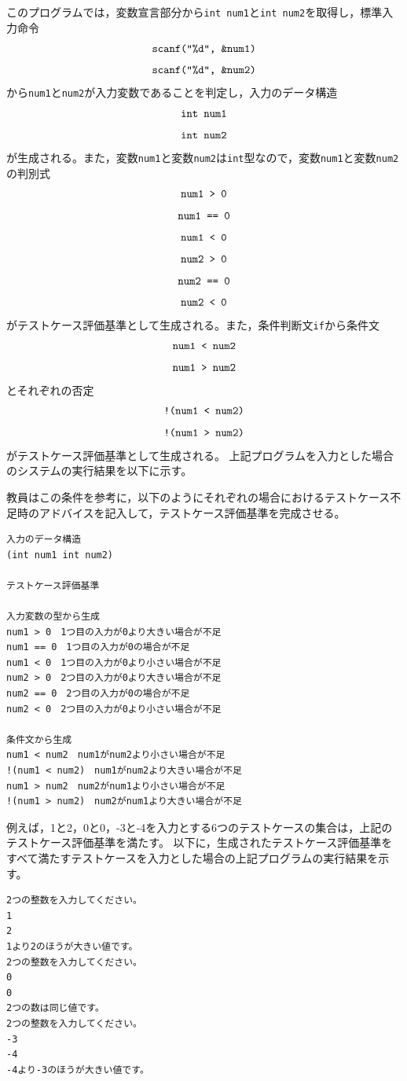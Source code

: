 \documentclass{tpu-sotu}
\begin{document}

このプログラムでは，変数宣言部分から{\tt int num1}と{\tt int num2}を取得し，標準入力命令\\
\[ 
\mbox{{\tt {scanf("\%d", \&num1)}}}
\]
\[ 
\mbox{{\tt {scanf("\%d", \&num2)}}}
\]
から{\tt num1}と{\tt num2}が入力変数であることを判定し，入力のデータ構造\\
\[
\mbox{{\tt int num1}}
\]
\[
\mbox{{\tt int num2}}
\]
が生成される。また，変数{\tt num1}と変数{\tt num2}は{\tt int}型なので，変数{\tt num1}と変数{\tt num2}の判別式\\
\[ 
\mbox{\tt{num1 > 0}} 
\]
\[
\mbox{\tt{num1 == 0}}
\]
\[
\mbox{\tt{num1 < 0}}
\]
\[ 
\mbox{\tt{num2 > 0}} 
\]
\[
\mbox{\tt{num2 == 0}}
\]
\[
\mbox{\tt{num2 < 0}}
\]
がテストケース評価基準として生成される。また，条件判断文{\tt if}から条件文\\
\[
\mbox{\tt{num1 < num2}}
\]
\[
\mbox{\tt{num1 > num2}}
\]
とそれぞれの否定\\
\[
\mbox{\tt{!(num1 < num2)}}
\]
\[
\mbox{\tt{!(num1 > num2)}}
\]
がテストケース評価基準として生成される。
上記プログラムを入力とした場合のシステムの実行結果を以下に示す。

教員はこの条件を参考に，以下のようにそれぞれの場合におけるテストケース不足時のアドバイスを記入して，テストケース評価基準を完成させる。
\begin{lstlisting}[xleftmargin=1cm]
入力のデータ構造
(int num1 int num2)

テストケース評価基準

入力変数の型から生成
num1 > 0　1つ目の入力が0より大きい場合が不足
num1 == 0　1つ目の入力が0の場合が不足
num1 < 0　1つ目の入力が0より小さい場合が不足
num2 > 0　2つ目の入力が0より大きい場合が不足
num2 == 0　2つ目の入力が0の場合が不足
num2 < 0　2つ目の入力が0より小さい場合が不足

条件文から生成
num1 < num2　num1がnum2より小さい場合が不足
!(num1 < num2)　num1がnum2より大きい場合が不足
num1 > num2　num2がnum1より小さい場合が不足
!(num1 > num2)　num2がnum1より大きい場合が不足
\end{lstlisting}
例えば，1と2，0と0，-3と-4を入力とする6つのテストケースの集合は，上記のテストケース評価基準を満たす。
以下に，生成されたテストケース評価基準をすべて満たすテストケースを入力とした場合の上記プログラムの実行結果を示す。
\begin{lstlisting}[xleftmargin=1cm]
2つの整数を入力してください。
1
2
1より2のほうが大きい値です。
2つの整数を入力してください。
0
0
2つの数は同じ値です。
2つの整数を入力してください。
-3
-4
-4より-3のほうが大きい値です。

\end{lstlisting}
\end{document}
